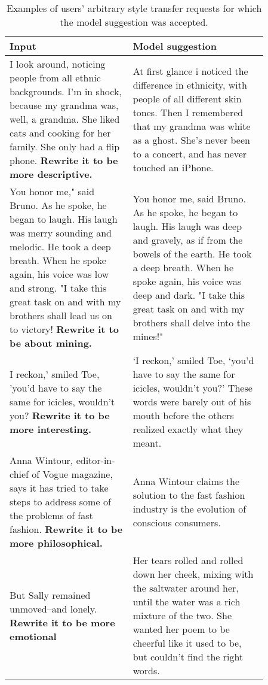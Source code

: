 \begin{table*}[ht]
    \caption{Examples of users' arbitrary style transfer requests for which the model suggestion was accepted.}
    \label{tab:selected_usage_examples}
\begin{adjustwidth}{-2cm}{}
    \small
    \centering
    \def\arraystretch{1.5}%
    \begin{tabular}{p{0.41\linewidth} p{0.45\linewidth}}
    \toprule
      \textbf{Input} & \textbf{Model suggestion} \\ \hline
      I look around, noticing people from all ethnic backgrounds. I’m in shock, because my grandma was, well, a grandma. She liked cats and cooking for her family. She only had a flip phone. \newline \textbf{Rewrite it to be more descriptive.} & At first glance i noticed the difference in ethnicity, with people of all different skin tones. Then I remembered that my grandma was white as a ghost. She's never been to a concert, and has never touched an iPhone. \\ \hline
      You honor me," said Bruno. As he spoke, he began to laugh. His laugh was merry sounding and melodic. He took a deep breath. When he spoke again, his voice was low and strong. "I take this great task on and with my brothers shall lead us on to victory! \newline \textbf{Rewrite it to be about mining.} & You honor me, said Bruno. As he spoke, he began to laugh. His laugh was deep and gravely, as if from the bowels of the earth. He took a deep breath. When he spoke again, his voice was deep and dark. "I take this great task on and with my brothers shall delve into the mines!" \\ \hline
      I reckon,' smiled Toe, 'you'd have to say the same for icicles, wouldn't you? \newline \textbf{Rewrite it to be more interesting.} & ‘I reckon,’ smiled Toe, ‘you’d have to say the same for icicles, wouldn’t you?’ These words were barely out of his mouth before the others realized exactly what they meant.\\ \hline
      Anna Wintour, editor-in-chief of Vogue magazine, says it has tried to take steps to address some of the problems of fast fashion. \newline \textbf{Rewrite it to be more philosophical.} & Anna Wintour claims the solution to the fast fashion industry is the evolution of conscious consumers. \\ \hline
      But Sally remained unmoved--and lonely. \newline \textbf{Rewrite it to be more emotional} & Her tears rolled and rolled down her cheek, mixing with the saltwater around her, until the water was a rich mixture of the two. She wanted her poem to be cheerful like it used to be, but couldn't find the right words. \\
    \bottomrule
    \end{tabular}
    \end{adjustwidth}
\end{table*}